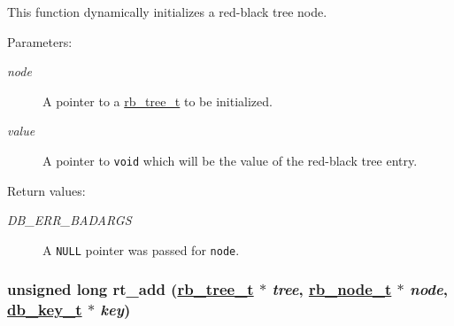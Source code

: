 This function dynamically initializes a red-black tree node.\begin{Desc}
\item[Parameters: ]\par
\begin{description}
\item[{\em 
node}]A pointer to a \hyperlink{group__dbprim__rbtree_a0}{rb\_\-tree\_\-t} to be initialized. \item[{\em 
value}]A pointer to {\tt void} which will be the value of the red-black tree entry.\end{description}
\end{Desc}
\begin{Desc}
\item[Return values: ]\par
\begin{description}
\item[{\em 
DB\_\-ERR\_\-BADARGS}]A {\tt NULL} pointer was passed for {\tt node}. \end{description}
\end{Desc}
\hypertarget{group__dbprim__rbtree_a6}{
\subsubsection[rt\_\-add]{\setlength{\rightskip}{0pt plus 5cm}unsigned long rt\_\-add (\hyperlink{group__dbprim__rbtree_a0}{rb\_\-tree\_\-t} $\ast$ {\em tree}, \hyperlink{group__dbprim__rbtree_a1}{rb\_\-node\_\-t} $\ast$ {\em node}, \hyperlink{group__dbprim_a0}{db\_\-key\_\-t} $\ast$ {\em key})}}
\label{group__dbprim__rbtree_a6}


